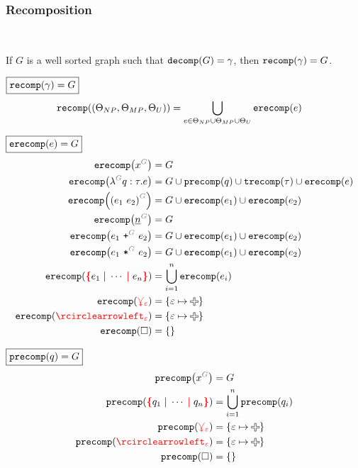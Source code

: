 
\subsubsection{Recomposition}\hspace*{\fill} \\

\begin{theorem}
  If $G$ is a well sorted graph such that $\decomp{G} = \Grove$,
  then $\recomp{\Grove} = G$.
\end{theorem}

\noindent $\boxed{\recomp{\Grove} = G}$
%
\begin{align*}
  \recomp{(\Set[NP], \Set[MP], \Set[U])} &= \bigcup_{e \in \Set[NP] \cup \Set[MP] \cup \Set[U]} \erecomp{e}
\end{align*}

\noindent $\boxed{\erecomp{e} = G}$
%
\begin{align*}
  \erecomp{\eVar{G}{x}} &= G
  \\
  \erecomp{\eFun{G}{q}{\tau}{e}}
    &= G \cup \precomp{q} \cup \trecomp{\tau} \cup \erecomp{e}
  \\
  \erecomp{\eApp{G}{e_1}{e_2}}
    &= G \cup \erecomp{e_1} \cup \erecomp{e_2}
  \\
  \erecomp{\eNum{G}{n}} &= G
  \\
  \erecomp{\ePlus{G}{e_1}{e_2}}
    &= G \cup \erecomp{e_1} \cup \erecomp{e_2}
  \\
  \erecomp{\eTimes{G}{e_1}{e_2}}
    &= G \cup \erecomp{e_1} \cup \erecomp{e_2}
  \\
  \erecomp{\conflictHole{e_1, \cdots, e_n}}
  &= \bigcup_{i=1}^n \erecomp{e_i}
  \\
  \erecomp{\multiVertex{\e}} &= \SetOf{\e \mapsto \Plus}
  \\
  \erecomp{\cycleVertex{\e}} &= \SetOf{\e \mapsto \Plus}
  \\
  \erecomp{\hole} &= \SetOf{}
\end{align*}

\noindent $\boxed{\precomp{q} = G}$
%
\begin{align*}
  \precomp{\pVar{G}{x}} &= G
  \\
  \precomp{\conflictHole{q_1, \cdots, q_n}} &= \bigcup_{i=1}^n \precomp{q_i}
  \\
  \precomp{\multiVertex{\e}} &= \SetOf{\e \mapsto \Plus}
  \\
  \precomp{\cycleVertex{\e}} &= \SetOf{\e \mapsto \Plus}
  \\
  \precomp{\hole} &= \SetOf{}
\end{align*}


